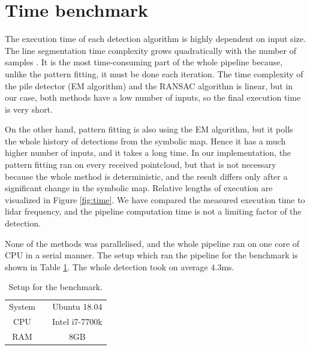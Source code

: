 \section{Time benchmark}
The execution time of each detection algorithm is highly dependent on input size. The line segmentation time complexity grows quadratically with the number of samples \cite{hershberger2000}. It is the most time-consuming part of the whole pipeline because, unlike the pattern fitting, it must be done each iteration. The time complexity of the pile detector (EM algorithm) and the RANSAC algorithm is linear, but in our case, both methods have a low number of inputs, so the final execution time is very short. 

On the other hand, pattern fitting is also using the EM algorithm, but it polls the whole history of detections from the symbolic map. Hence it has a much higher number of inputs, and it takes a long time. In our implementation, the pattern fitting ran on every received pointcloud, but that is not necessary because the whole method is deterministic, and the result differs only after a significant change in the symbolic map. Relative lengths of execution are visualized in Figure \ref{fig:time}. We have compared the measured execution time to lidar frequency, and the pipeline computation time is not a limiting factor of the detection.

None of the methods was parallelised, and the whole pipeline ran on one core of CPU in a serial manner. The setup which ran the pipeline for the benchmark is shown in Table \ref{tab:benchmark}. The whole detection took on average $4.3$ms.

\begin{table}[H]
	\centering
	\caption{Setup for the benchmark.}
	\begin{tabular}{ccc}
		\toprule
		System &\quad& Ubuntu 18.04 \\
		CPU &\quad& Intel i7-7700k  \\
		RAM &\quad& 8GB \\
		\bottomrule
	\end{tabular}
	\label{tab:benchmark}
\end{table}

